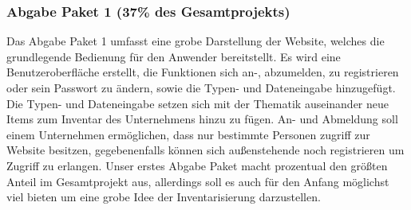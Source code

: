 \documentclass[11pt,a4paper]{report}
\begin{document}
\subsubsection{Abgabe Paket 1 (37\% des Gesamtprojekts)}
Das Abgabe Paket 1 umfasst eine grobe Darstellung der Website, welches die grundlegende Bedienung für den Anwender bereitstellt.
Es wird eine Benutzeroberfläche erstellt, die Funktionen sich an-, abzumelden, zu registrieren oder sein Passwort zu ändern, sowie die Typen- und Dateneingabe hinzugefügt.
Die Typen- und Dateneingabe setzen sich mit der Thematik auseinander neue Items zum Inventar des Unternehmens hinzu zu fügen.
An- und Abmeldung soll einem Unternehmen ermöglichen, dass nur bestimmte Personen zugriff zur Website besitzen, gegebenenfalls können sich außenstehende noch registrieren um Zugriff zu erlangen.
Unser erstes Abgabe Paket macht prozentual den größten Anteil im Gesamtprojekt aus, allerdings soll es auch für den Anfang möglichst viel bieten um eine grobe Idee der Inventarisierung darzustellen.
\end{document}
